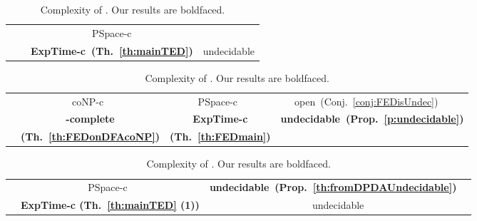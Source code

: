 \documentclass{CSML}
\newcommand{\PSPACE}{\textsf{PSpace}}
\newcommand{\EXPTIME}{\textsf{ExpTime}}
\newcommand{\coNP}{\textsf{coNP}}
\newcommand{\undecidable}{undecidable}
\begin{document}
\begin{table}[t]
\begin{subtable}
\centering\centering
\begin{tabular}{|c|c|c|c|c|}
\hline
&  &   &  &  \\ 
\hline
 & \multirow{2}{*}{} & \PSPACE-c   & 
  &  \\
\cline{1-1}
\cline{3-4}
{} &  & \textbf{\EXPTIME-c~(Th.~\ref{th:mainTED})} & 
\multicolumn{2}{c|}{ {\undecidable}} \\
\hline
\end{tabular}
\caption{Complexity of the language inclusion problem from  to . Our results are boldfaced.
}
\label{tab:complexityOfINC}
\end{subtable}

\begin{subtable}
\centering\centering
\begin{tabular}{|c|c|c|c|c|}
\hline
&  &   &  &  \\ 
\hline
 & \coNP-c~\cite{boundedRiveros} & \PSPACE-c~\cite{boundedRiveros}   & 
 open~(Conj.~\ref{conj:FEDisUndec}) &  \\
\cline{1-4}
\multirow{2}{*}{} &   \textbf{-complete}& \textbf{\EXPTIME-c} & 
\multicolumn{2}{c|}{\multirow{2}{*}{ \textbf{\undecidable~(Prop.~\ref{p:undecidable})}}} \\
&  \textbf{(Th.~\ref{th:FEDonDFAcoNP})}    & \textbf{(Th.~\ref{th:FEDmain})}  &   \multicolumn{2}{c|}{}\\
\hline
\end{tabular}
\caption{Complexity of . Our results are boldfaced.
}
\label{tab:complexityOfFED}
\end{subtable}

\begin{subtable}
\centering\centering
\begin{tabular}{|c|c|c|c|c|}
\hline
&  &   &  &  \\ 
\hline
 & \multicolumn{2}{c|}{ \PSPACE-c~\cite{riveros}}   & 
\textbf{\undecidable~(Prop.~\ref{th:fromDPDAUndecidable})} & \\
\cline{1-4}
{} &   \multicolumn{2}{c|}{\textbf{\EXPTIME-c (Th.~\ref{th:mainTED} (1))}} & \multicolumn{2}{c|}{\undecidable}   \\
\hline
\end{tabular}
\caption{Complexity of . Our results are boldfaced.\hspace{3cm}}
\label{tab:complexityOfTED}
\end{subtable}
\end{table}
\end{document}
